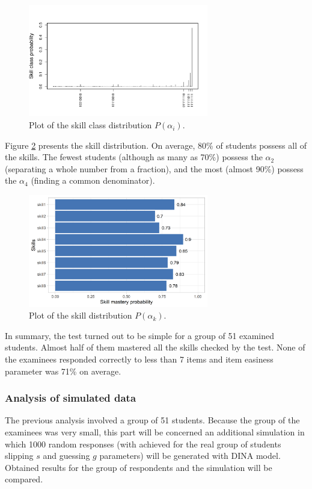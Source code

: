 \documentclass[english]{pwr_wmat_praca_dyplomowa}
\theoremstyle{plain}
\theoremstyle{definition}
\numberwithin{theorem}{chapter}
\begin{document}
\begin{figure}[h!]
	\centering
	\includegraphics[width=0.7\textwidth]{Skill_class_probability_0.pdf}
	\caption{Plot of the skill class distribution $P(\alpha_i)$.}
	\label{skill_class_dist}
\end{figure}

Figure \ref{skill_possession} presents the skill distribution. On average, 80\% of students possess all of the skills. The fewest students (although as many as 70\%) possess the $\alpha_2$ (separating a whole number from a fraction), and the most (almost 90\%) possess the $\alpha_4$ (finding a common denominator).

\begin{figure}[h!]
	\centering
	\includegraphics[width=0.7\textwidth]{Skill_mastery_probability.png}
	\caption{Plot of the skill distribution $P(\alpha_k)$.}
	\label{skill_possession}
\end{figure}

In summary, the test turned out to be simple for a group of 51 examined students. Almost half of them mastered all the skills checked by the test. None of the examinees responded correctly to less than 7 items and item easiness parameter was 71\% on average.

\subsubsection{Analysis of simulated data}
The previous analysis involved a group of 51 students. Because the group of the examinees was very small, this part will be concerned an additional simulation in which 1000 random responses (with achieved for the real group of students slipping $s$ and guessing $g$ parameters) will be generated with DINA model. Obtained results for the group of respondents and the simulation will be compared.
\end{document}
